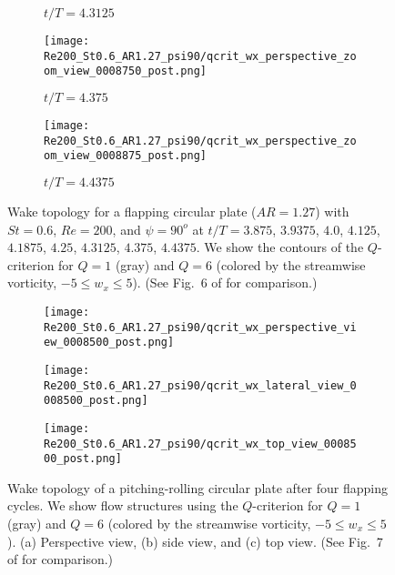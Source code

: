 \begin{figure}[H]
\begin{subfigure}[b]{0.3\textwidth}
    \caption{$t / T = 4.3125$}
    \label{fig:baseline_qcrit_perspective:0008625}
  \end{subfigure}
  \hspace{0.5em}
  \begin{subfigure}[b]{0.3\textwidth}
    \centering
    \texttt{[image: Re200\_St0.6\_AR1.27\_psi90/qcrit\_wx\_perspective\_zoom\_view\_0008750\_post.png]}
    \caption{$t / T = 4.375$}
    \label{fig:baseline_qcrit_perspective:0008750}
  \end{subfigure}
  \hspace{0.5em}
  \begin{subfigure}[b]{0.3\textwidth}
    \centering
    \texttt{[image: Re200\_St0.6\_AR1.27\_psi90/qcrit\_wx\_perspective\_zoom\_view\_0008875\_post.png]}
    \caption{$t / T = 4.4375$}
    \label{fig:baseline_qcrit_perspective:0008875}
  \end{subfigure}
  \caption{Wake topology for a flapping circular plate ($AR = 1.27$) with $St = 0.6$, $Re = 200$, and $\psi = 90^o$ at $t / T = 3.875$, $3.9375$, $4.0$, $4.125$, $4.1875$, $4.25$, $4.3125$, $4.375$, $4.4375$. We show the contours of the $Q$-criterion for $Q = 1$ (gray) and $Q = 6$ (colored by the streamwise vorticity, $-5 \leq w_x \leq 5$). (See Fig.~6 of \citet{li_dong_2016} for comparison.)}
  \label{fig:baseline_qcrit_perspective}
\end{figure}

\begin{figure}[H]
  \centering
  \begin{minipage}{0.55\linewidth}
    \begin{subfigure}[t]{\linewidth}
      \texttt{[image: Re200\_St0.6\_AR1.27\_psi90/qcrit\_wx\_perspective\_view\_0008500\_post.png]}
      \caption{}
      \label{fig:baseline_wake_topology:perspective}
    \end{subfigure}
  \end{minipage}
  \begin{minipage}{0.35\linewidth}
    \begin{subfigure}[t]{\linewidth}
      \texttt{[image: Re200\_St0.6\_AR1.27\_psi90/qcrit\_wx\_lateral\_view\_0008500\_post.png]}
      \caption{}
      \label{fig:baseline_wake_topology:lateral}
    \end{subfigure}
    \vspace{1cm}
    \begin{subfigure}[b]{\linewidth}
      \texttt{[image: Re200\_St0.6\_AR1.27\_psi90/qcrit\_wx\_top\_view\_0008500\_post.png]}
      \caption{}
      \label{fig:baseline_wake_topology:top}
    \end{subfigure}
  \end{minipage}
  \caption{Wake topology of a pitching-rolling circular plate after four flapping cycles. We show flow structures using the $Q$-criterion for $Q = 1$ (gray) and $Q = 6$ (colored by the streamwise vorticity, $-5 \leq w_x \leq 5$). (a) Perspective view, (b) side view, and (c) top view. (See Fig.~7 of \citet{li_dong_2016} for comparison.)}
  \label{fig:baseline_wake_topology}
\end{figure}

